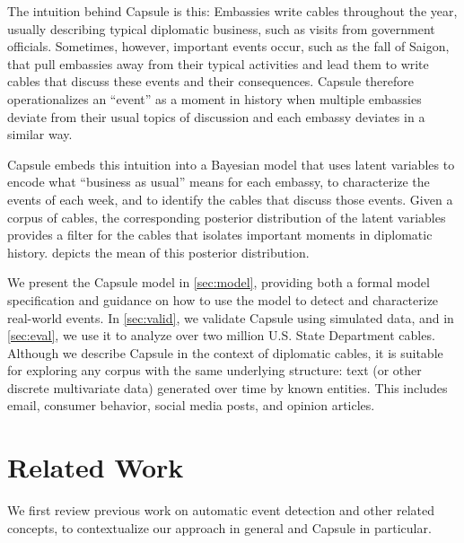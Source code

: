 The intuition behind Capsule is this: Embassies write cables
throughout the year, usually describing typical diplomatic business,
such as visits from government officials. Sometimes, however,
important events occur, such as the fall of Saigon, that pull
embassies away from their typical activities and lead them to write
cables that discuss these events and their consequences. Capsule
therefore operationalizes an ``event'' as a moment in history when
multiple embassies deviate from their usual topics of discussion and
each embassy deviates in a similar way.

Capsule embeds this intuition into a Bayesian model that uses latent
variables to encode what ``business as usual'' means for each embassy,
to characterize the events of each week, and to identify the cables
that discuss those events. Given a corpus of cables, the corresponding
posterior distribution of the latent variables provides a filter for
the cables that isolates important moments in diplomatic
history.  depicts the mean of this posterior
distribution.

We present the Capsule model in \cref{sec:model}, providing both a
formal model specification and guidance on how to use the model to
detect and characterize real-world events. In \cref{sec:valid}, we
validate Capsule using simulated data, and in \cref{sec:eval},
we use it to analyze over two million U.S. State Department
cables. Although we describe Capsule in the context of diplomatic
cables, it is suitable for exploring any corpus with the same
underlying structure: text (or other discrete multivariate data)
generated over time by known entities. This includes email, consumer
behavior, social media posts, and opinion articles.

\section{Related Work}
\label{sec:relatedwork}


We first review previous work on automatic event detection and other
related concepts, to contextualize our approach in general and Capsule
in particular.


